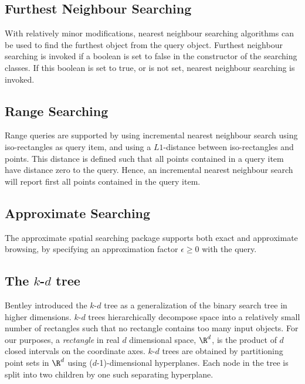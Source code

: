 \subsection{Furthest Neighbour Searching}

With relatively minor modifications, nearest neighbour searching algorithms can be
used to find the furthest object from the query object. Furthest neighbour searching is invoked if
a boolean  is set to false in the constructor of the searching classes.
If this boolean is set to true, or is not set, nearest neighbour searching is invoked.

\subsection{Range Searching}

Range queries are supported by using incremental nearest neighbour search
using iso-rectangles as query item, and using a $L1$-distance between iso-rectangles and points.
This distance is defined such that all points contained in a query item have distance zero
to the query. Hence, an incremental nearest neighbour search will report first all points
contained in the query item.  

\subsection{Approximate Searching}

The approximate spatial searching package supports both exact and approximate browsing, by
specifying an approximation factor $\epsilon \geq 0$ with the query.

\subsection{The $k$-$d$ tree}

Bentley \cite{b-mbstu-75} introduced the $k$-$d$ tree as a generalization of the binary
search tree in higher dimensions. $k$-$d$ trees hierarchically decompose space into a
relatively small number of rectangles such that no rectangle contains too many input objects.
For our purposes, a {\it rectangle} in real $d$ dimensional space, $\R^d$, is the product of $d$ closed
intervals on the coordinate axes.
$k$-$d$ trees are obtained by partitioning point sets in $\R^d$ using
($d$-1)-dimensional hyperplanes.
Each node in the tree is split into two children by one such separating hyperplane.

